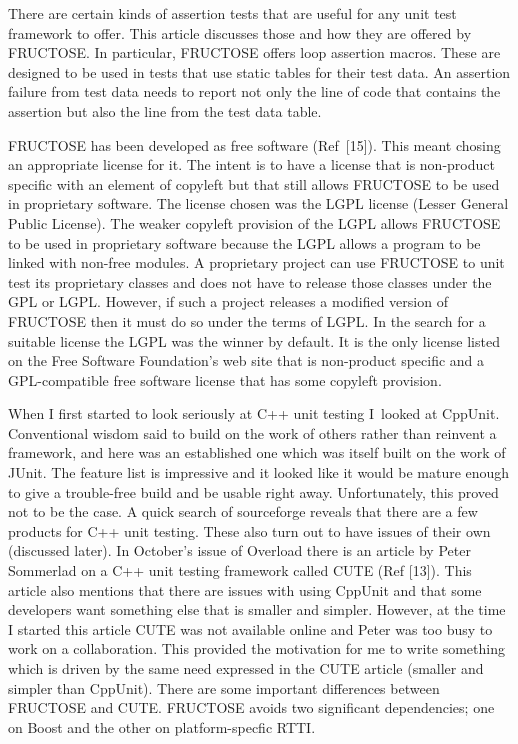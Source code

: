 \documentclass{book}
\begin{document}
There are certain kinds of assertion tests that are useful for any
unit test framework to offer. This article discusses those and how they are
offered by FRUCTOSE. In particular, FRUCTOSE offers loop assertion macros.
These are designed to be used in tests that use static tables for their
test data. An assertion failure from test data needs to report not only
the line of code that contains the assertion but also the line from the
test data table.

FRUCTOSE has been developed as free software (Ref~[15]).
This meant chosing an appropriate license for it.
The intent is to have a license that is non-product specific
with an element of copyleft but that still
allows FRUCTOSE to be used in proprietary software.
The license chosen was the LGPL license (Lesser General Public License).
The weaker copyleft provision of the LGPL allows FRUCTOSE to be used in 
proprietary software because the LGPL allows a program to be linked 
with non-free modules.
A proprietary project can use FRUCTOSE to unit test its proprietary
classes and does not have to release those classes under the GPL or LGPL.
However, if such a project releases a modified
version of FRUCTOSE then it must do so under the terms of LGPL.
In the search for a suitable license the LGPL was the winner by default.
It is the only license listed on the Free Software Foundation's
web site that is non-product specific and
a GPL-compatible free software license that has
some copyleft provision.


When I first started to look seriously at C++ unit testing I~looked at CppUnit.
Conventional wisdom said to build on the work of others rather than reinvent a
framework, and here was an established one which was itself built on the work
of JUnit. The feature list is impressive and it looked like it would be mature
enough to give a trouble-free build and be usable right away.
Unfortunately, this proved not to be the case. A quick search of sourceforge
reveals that there are a few products for C++ unit testing. These also turn
out to have issues of their own (discussed later). In October's issue of
Overload there is an article by Peter Sommerlad on a C++ unit testing
framework called CUTE (Ref [13]). This article also mentions that there are
issues with using CppUnit and that some developers want something else that
is smaller and simpler. However, at the time I started this article CUTE was
not available online and Peter was too busy to work on a collaboration. 
This provided the motivation for me to write something which is driven by the
same need expressed in the CUTE article (smaller and simpler than CppUnit). 
There are some important differences between FRUCTOSE and CUTE.
FRUCTOSE avoids two significant dependencies; one on Boost and the other 
on platform-specfic RTTI.
\end{document}
